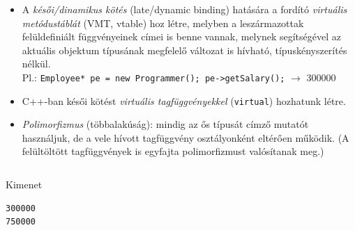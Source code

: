 \begin{frame}
    \begin{itemize}
        \item A \emph{késői/dinamikus kötés} (late/dynamic binding) hatására a fordító \emph{virtuális metódustáblát} (VMT, vtable) hoz létre, melyben a leszármazottak felüldefiniált függvényeinek címei is benne vannak, melynek segítségével az aktuális objektum típusának megfelelő változat is hívható, típuskényszerítés nélkül. \\ Pl.: \texttt{Employee* pe = new Programmer(); pe->getSalary();} $\to$ 300000
        \item C++-ban késői kötést \emph{virtuális tagfüggvényekkel} (\texttt{virtual}) hozhatunk létre.
        \item \emph{Polimorfizmus} (többalakúság): mindig az ős típusát címző mutatót használjuk, de a vele hívott tagfüggvény osztályonként eltérően működik. (A felültöltött tagfüggvények is egyfajta polimorfizmust valósítanak meg.)
    \end{itemize}
\end{frame}

\begin{frame}
    \begin{columns}[T]
            \begin{exampleblock}{}
                \vspace{-.2cm}
                \fontsize{7}{8} \selectfont
                
                \vspace{-.2cm}
            \end{exampleblock}
            \begin{exampleblock}{}
                \vspace{-.2cm}
                \fontsize{7}{8} \selectfont
                
                \vspace{-.2cm}
            \end{exampleblock}
    \end{columns}
\end{frame}

\begin{frame}[fragile]
    \begin{exampleblock}{}
        \footnotesize
        
    \end{exampleblock}
    \begin{block}{Kimenet}
        \footnotesize
        \vspace{-.3cm}
        \begin{verbatim}
300000
750000
        \end{verbatim}
        \vspace{-.6cm}
    \end{block}
\end{frame}

